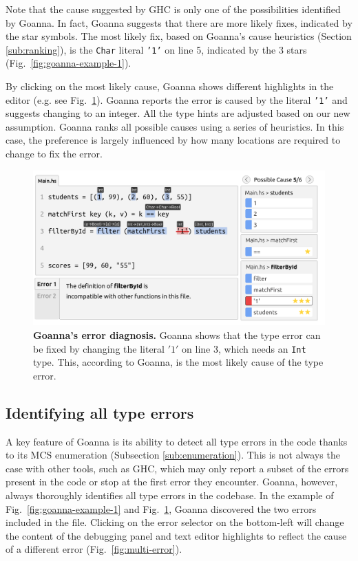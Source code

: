     Note that the cause suggested by GHC is only one of the possibilities identified by Goanna. In fact, Goanna suggests that there are more likely fixes, indicated by the star symbols. The most likely fix, based on Goanna's cause heuristics (Section \ref{sub:ranking}), is the \texttt{Char} literal \texttt{'1'} on line 5, indicated by the 3 stars (Fig.~\ref{fig:goanna-example-1}).
    
    
    By clicking on the most likely cause, Goanna shows different highlights in the editor (e.g. see Fig.~\ref{fig:goanna-example-2}). Goanna reports the error is caused by the literal \texttt{'1'} and suggests changing to an integer. All the type hints are adjusted based on our new assumption. Goanna ranks all possible causes using a series of heuristics. In this case, the preference is largely influenced by how many locations are required to change to fix the error. 
    
    \begin{figure}[ht!]
        \centering
        \includegraphics[width=\linewidth]{images/goanna-example-2}
        \caption[Goanna's showing possible causes of a type error (2)]{\textbf{Goanna's error diagnosis.} Goanna shows that the type error can be fixed by changing the literal $'1'$ on line 3, which needs an \texttt{Int} type. This, according to Goanna, is the most likely cause of the type error.}
        \label{fig:goanna-example-2}
    \end{figure}


    \subsection{Identifying all type errors} \label{sub:all-errors}
    
    A key feature of Goanna is its ability to detect all type errors in the code thanks to its MCS enumeration (Subsection \ref{sub:enumeration}). This is not always the case with other tools, such as GHC, which may only report a subset of the errors present in the code or stop at the first error they encounter. Goanna, however, always thoroughly identifies all type errors in the codebase. In the example of Fig.~\ref{fig:goanna-example-1} and Fig.~\ref{fig:goanna-example-2}, Goanna discovered the two errors included in the file. Clicking on the error selector on the bottom-left will change the content of the debugging panel and text editor highlights to reflect the cause of a different error (Fig.~\ref{fig:multi-error}). 

